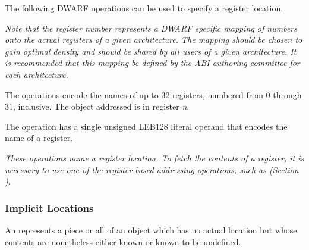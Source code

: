 The following DWARF operations can be used to
specify a register location.

\textit{Note that the register number represents a DWARF specific
mapping of numbers onto the actual registers of a given
architecture. The mapping should be chosen to gain optimal
density and should be shared by all users of a given
architecture. It is recommended that this mapping be defined
by the ABI authoring committee for each architecture.
}
\begin{enumerate}[1. ]
The \DWOPregnTARG{} operations encode the names of up to 32
registers, numbered from 0 through 31, inclusive. The object
addressed is in register \textit{n}.

\itembfnl{\DWOPregxTARG}
The \DWOPregxNAME{} operation has a single
unsigned LEB128 literal
operand that encodes the name of a register.

\end{enumerate}

\textit{These operations name a register location. To
fetch the contents of a register, it is necessary to use
one of the register based addressing operations, such as
\DWOPbregx{}
(Section )}.

\subsubsection{Implicit Locations}
\label{chap:implicitlocations}
An  represents a piece or all
 of an object which has no actual
location but whose contents are nonetheless either known or known to
be undefined.

